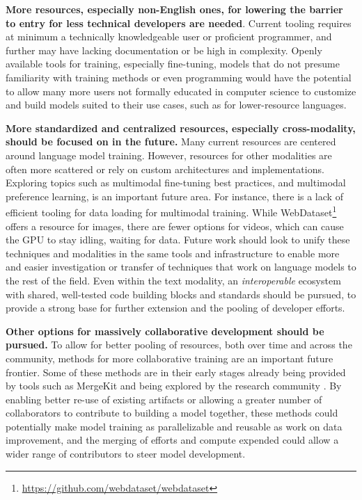 

\textbf{More resources, especially non-English ones, for lowering the barrier to entry for less technical developers are needed}. Current tooling requires at minimum a technically knowledgeable user or proficient programmer, and further may have lacking documentation or be high in complexity. Openly available tools for training, especially fine-tuning, models that do not presume familiarity with training methods or even programming would have the potential to allow many more users not formally educated in computer science to customize and build models suited to their use cases, such as for lower-resource languages. 


\textbf{More standardized and centralized resources, especially cross-modality, should be focused on in the future.} Many current resources are centered around language model training. However, resources for other modalities are often more scattered or rely on custom architectures and implementations. Exploring topics such as multimodal fine-tuning best practices, and multimodal preference learning, is an important future area. 
For instance, there is a lack of efficient tooling for data loading for multimodal training. While WebDataset\footnote{\url{https://github.com/webdataset/webdataset}} offers a resource for images, there are fewer options for videos, which can cause the GPU to stay idling, waiting for data.
Future work should look to unify these techniques and modalities in the same tools and infrastructure to enable more and easier investigation or transfer of techniques that work on language models to the rest of the field. Even within the text modality, an \textit{interoperable} ecosystem with shared, well-tested code building blocks and standards should be pursued, to provide a strong base for further extension and the pooling of developer efforts.


\textbf{Other options for massively collaborative development should be pursued.}
To allow for better pooling of resources, both over time and across the community, methods for more collaborative training are an important future frontier. Some of these methods are in their early stages already being provided by tools such as MergeKit \citep{goddard2024arcees} and being explored by the research community \citep{matena2022merging, donyehiya2023cold, stoica2024zipit, yadav2023tiesmerging}. By enabling better re-use of existing artifacts or allowing a greater number of collaborators to contribute to building a model together, these methods could potentially make model training as parallelizable and reusable as work on data improvement, and the merging of efforts and compute expended could allow a wider range of contributors to steer model development.



